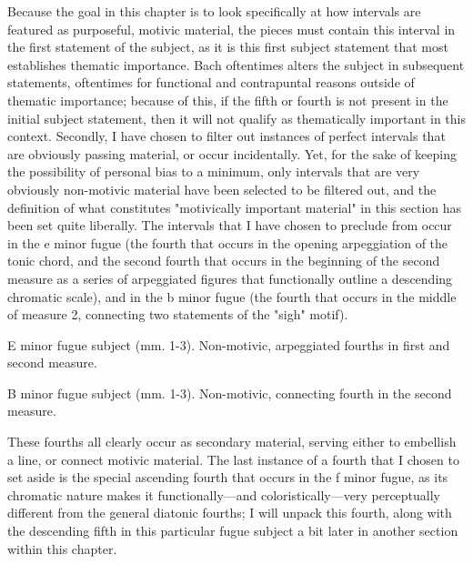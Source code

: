 Because the goal in this chapter is to look specifically at how
intervals are featured as purposeful, motivic material, the pieces must
contain this interval in the first statement of the subject, as it is
this first subject statement that most establishes thematic importance.
Bach oftentimes alters the subject in subsequent statements, oftentimes
for functional and contrapuntal reasons outside of thematic importance;
because of this, if the fifth or fourth is not present in the initial
subject statement, then it will not qualify as thematically important in
this context. Secondly, I have chosen to filter out instances of perfect
intervals that are obviously passing material, or occur incidentally.
Yet, for the sake of keeping the possibility of personal bias to a
minimum, only intervals that are very obviously non-motivic material
have been selected to be filtered out, and the definition of what
constitutes "motivically important material" in this section has been
set quite liberally. The intervals that I have chosen to preclude from
occur in the e minor fugue (the fourth that occurs in the opening
arpeggiation of the tonic chord, and the second fourth that occurs in
the beginning of the second measure as a series of arpeggiated figures
that functionally outline a descending chromatic scale), and in the b
minor fugue (the fourth that occurs in the middle of measure 2,
connecting two statements of the "sigh" motif).



\begin{Example}[H]
    \begin{center}
    \caption[E minor fugue subject (mm. 1-3). ]{ E minor fugue subject (mm. 1-3). Non-motivic, arpeggiated fourths in first and second measure.}
    \end{center}
\end{Example}
    


\begin{Example}[H]
    \begin{center}
    \caption[B minor fugue subject (mm. 1-3). ]{ B minor fugue subject (mm. 1-3). Non-motivic, connecting fourth in the second measure.}
    \end{center}
\end{Example}
    
    These fourths all clearly occur as secondary material, serving either to
embellish a line, or connect motivic material. The last instance of a
fourth that I chosen to set aside is the special ascending fourth that
occurs in the f minor fugue, as its chromatic nature makes it
functionally---and coloristically---very perceptually different
from the general diatonic fourths; I will unpack this fourth, along with
the descending fifth in this particular fugue subject a bit later in
another section within this chapter.



